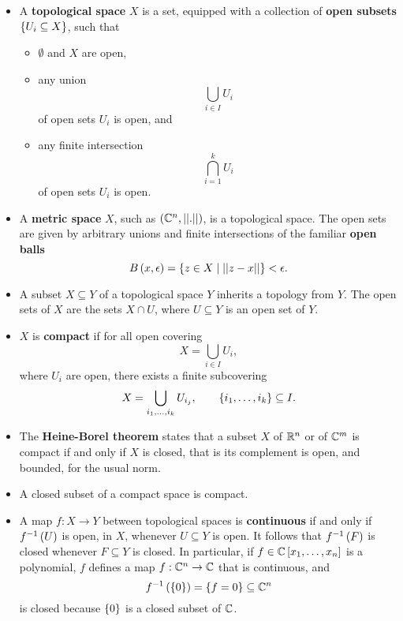 \begin{remark}
\label{rem:2.19}
\hfill
\begin{itemize}
\item A \textbf{topological space} $ X $ is a set, equipped with a collection of \textbf{open subsets} $ \left\{ U_i \subseteq X \right\} $, such that
\begin{itemize}
\item $ \emptyset $ and $ X $ are open,
\item any union
$$ \bigcup_{i \in I} U_i $$
of open sets $ U_i $ is open, and
\item any finite intersection
$$ \bigcap_{i = 1}^k U_i $$
of open sets $ U_i $ is open.
\end{itemize}
\item A \textbf{metric space} $ X $, such as $ \left( \mathbb{C}^n, \left\lvert \left\lvert . \right\rvert \right\rvert \right) $, is a topological space. The open sets are given by arbitrary unions and finite intersections of the familiar \textbf{open balls}
$$ B\left( x, \epsilon \right) = \left\{ z \in X \mid \left\lvert \left\lvert z - x \right\rvert \right\rvert \right\} < \epsilon. $$
\item A subset $ X \subseteq Y $ of a topological space $ Y $ inherits a topology from $ Y $. The open sets of $ X $ are the sets $ X \cap U $, where $ U \subseteq Y $ is an open set of $ Y $.
\item $ X $ is \textbf{compact} if for all open covering
$$ X = \bigcup_{i \in I} U_i, $$
where $ U_i $ are open, there exists a finite subcovering
$$ X = \bigcup_{i_1, \dots, i_k} U_{i_j}, \qquad \left\{ i_1, \dots, i_k \right\} \subseteq I. $$
\item The \textbf{Heine-Borel theorem} states that a subset $ X $ of $ \mathbb{R}^n $ or of $ \mathbb{C}^m $ is compact if and only if $ X $ is closed, that is its complement is open, and bounded, for the usual norm.
\item A closed subset of a compact space is compact.
\item A map $ f : X \to Y $ between topological spaces is \textbf{continuous} if and only if $ f^{-1}\left( U \right) $ is open, in $ X $, whenever $ U \subseteq Y $ is open. It follows that $ f^{-1}\left( F \right) $ is closed whenever $ F \subseteq Y $ is closed. In particular, if $ f \in \mathbb{C}\left[ x_1, \dots, x_n \right] $ is a polynomial, $ f $ defines a map $ f : \mathbb{C}^n \to \mathbb{C} $ that is continuous, and
$$ f^{-1}\left( \left\{ 0 \right\} \right) = \left\{ f = 0 \right\} \subseteq \mathbb{C}^n $$
is closed because $ \left\{ 0 \right\} $ is a closed subset of $ \mathbb{C} $.
\end{itemize}
\end{remark}

